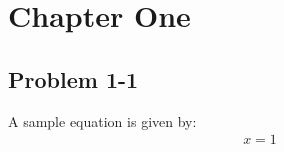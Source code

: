 \chapter{Chapter One}
\label{ch:One}

\section{Problem 1-1}
\label{sec:1-1}
A sample equation is given by:
\begin{align}
	x = 1
\end{align}

